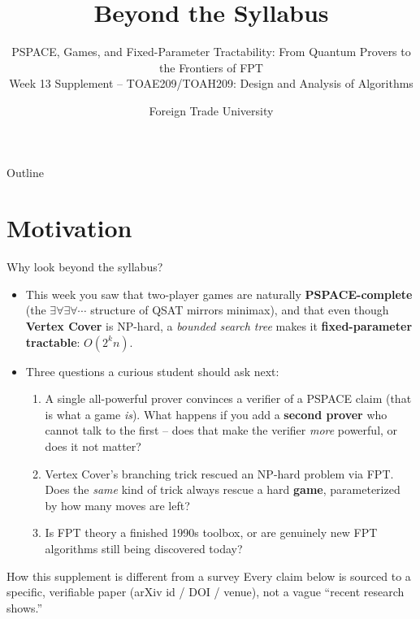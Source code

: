 \documentclass[11pt,aspectratio=169]{beamer}
\title{Beyond the Syllabus}
\subtitle{PSPACE, Games, and Fixed-Parameter Tractability: From Quantum Provers to the
Frontiers of FPT\\
\small Week 13 Supplement -- TOAE209/TOAH209: Design and Analysis of Algorithms}
\author{Foreign Trade University}
\date{}
\begin{document}
\begin{frame}
  \titlepage
\end{frame}

\begin{frame}{Outline}
  \tableofcontents
\end{frame}

\section{Motivation}

\begin{frame}{Why look beyond the syllabus?}
  \begin{itemize}
    \item This week you saw that two-player games are naturally
    \textbf{PSPACE-complete} (the $\exists\forall\exists\forall\cdots$ structure of
    QSAT mirrors minimax), and that even though \textbf{Vertex Cover} is NP-hard, a
    \emph{bounded search tree} makes it \textbf{fixed-parameter tractable}: $O(2^k n)$.
    \item Three questions a curious student should ask next:
    \begin{enumerate}
      \item A single all-powerful prover convinces a verifier of a PSPACE claim (that
      is what a game \emph{is}). What happens if you add a \textbf{second prover} who
      cannot talk to the first -- does that make the verifier \emph{more} powerful, or
      does it not matter?
      \item Vertex Cover's branching trick rescued an NP-hard problem via FPT. Does the
      \emph{same} kind of trick always rescue a hard \textbf{game}, parameterized by
      how many moves are left?
      \item Is FPT theory a finished 1990s toolbox, or are genuinely new FPT algorithms
      still being discovered today?
    \end{enumerate}
  \end{itemize}
  \begin{alertblock}{How this supplement is different from a survey}
    Every claim below is sourced to a specific, verifiable paper (arXiv id / DOI /
    venue), not a vague ``recent research shows.''
  \end{alertblock}
\end{frame}
\end{document}
